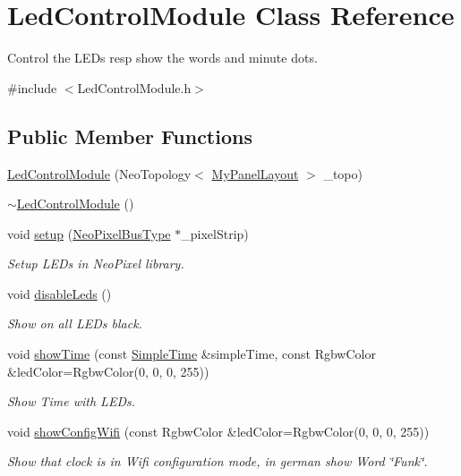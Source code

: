 \hypertarget{class_led_control_module}{}\section{Led\+Control\+Module Class Reference}
\label{class_led_control_module}


Control the L\+E\+Ds resp show the words and minute dots.  




{\ttfamily \#include $<$Led\+Control\+Module.\+h$>$}

\subsection*{Public Member Functions}
\begin{DoxyCompactItemize}
\item 
\mbox{\hyperlink{class_led_control_module_a5a653e4a322f618a6937449fafe959bb}{Led\+Control\+Module}} (Neo\+Topology$<$ \mbox{\hyperlink{_led_control_module_8h_a49b2323848e516b3241e758de64f0b3b}{My\+Panel\+Layout}} $>$ \+\_\+topo)
\item 
\mbox{\hyperlink{class_led_control_module_af6763089aa43e6be196651ec6708a4cd}{$\sim$\+Led\+Control\+Module}} ()
\item 
void \mbox{\hyperlink{class_led_control_module_ae1eb70e65006f55b30f6a034706829b5}{setup}} (\mbox{\hyperlink{_led_control_module_8h_a51a7b766d62733fca1ec20e82e024f9f}{Neo\+Pixel\+Bus\+Type}} $\ast$\+\_\+pixel\+Strip)
\begin{DoxyCompactList}\small\item\em Setup L\+E\+Ds in Neo\+Pixel library. \end{DoxyCompactList}\item 
void \mbox{\hyperlink{class_led_control_module_abd6255fc5d3a54b5befd131e56674313}{disable\+Leds}} ()
\begin{DoxyCompactList}\small\item\em Show on all L\+E\+Ds black. \end{DoxyCompactList}\item 
void \mbox{\hyperlink{class_led_control_module_a873a4c44c95a7da2ca0665b0e69cf392}{show\+Time}} (const \mbox{\hyperlink{class_simple_time}{Simple\+Time}} \&simple\+Time, const Rgbw\+Color \&led\+Color=Rgbw\+Color(0, 0, 0, 255))
\begin{DoxyCompactList}\small\item\em Show Time with L\+E\+Ds. \end{DoxyCompactList}\item 
void \mbox{\hyperlink{class_led_control_module_a70c42e2f9baee807bfdb9fe9bd2f6d8e}{show\+Config\+Wifi}} (const Rgbw\+Color \&led\+Color=Rgbw\+Color(0, 0, 0, 255))
\begin{DoxyCompactList}\small\item\em Show that clock is in Wifi configuration mode, in german show Word \char`\"{}\+Funk\char`\"{}. \end{DoxyCompactList}\end{DoxyCompactItemize}
